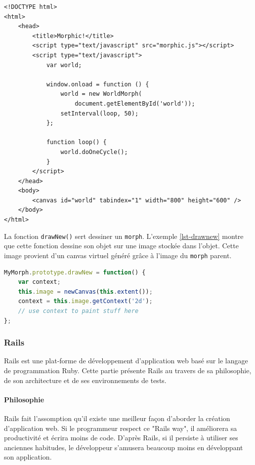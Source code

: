\begin{lstlisting}[caption={Exemple d'utilisation de \texttt{morphic.js}},label=lst-doonecycle,language=HTML5,alsolanguage=JavaScript]
<!DOCTYPE html>
<html>
    <head>
        <title>Morphic!</title>
        <script type="text/javascript" src="morphic.js"></script>
        <script type="text/javascript">
            var world;

            window.onload = function () {
                world = new WorldMorph(
                    document.getElementById('world'));
                setInterval(loop, 50);
            };

            function loop() {
                world.doOneCycle();
            }
        </script>
    </head>
    <body>
        <canvas id="world" tabindex="1" width="800" height="600" />
    </body>
</html>
\end{lstlisting}

La fonction \texttt{drawNew()} sert dessiner un \texttt{morph}. L'exemple \ref{lst-drawnew} montre que cette fonction dessine son objet sur une image stockée dans l'objet. Cette image provient d'un canvas virtuel généré grâce à l'image du \texttt{morph} parent.

\begin{lstlisting}[caption={Modèle pour la fonction \texttt{drawNew()}},label=lst-drawnew,language=JavaScript]
MyMorph.prototype.drawNew = function() {
    var context;
    this.image = newCanvas(this.extent());
    context = this.image.getContext('2d');
    // use context to paint stuff here
};
\end{lstlisting}

\subsubsection{Rails}
Rails est une plat-forme de développement d'application web basé sur le langage de programmation Ruby. Cette partie présente Rails au travers de sa philosophie, de son architecture et de ses environnements de tests.

\paragraph{Philosophie}
Rails fait l'assomption qu'il existe une meilleur façon d'aborder la création d'application web. Si le programmeur respect ce "Rails way", il améliorera sa productivité et écrira moins de code. D'après Rails, si il persiste à utiliser ses anciennes habitudes, le développeur s'amusera beaucoup moins en développant son application.

